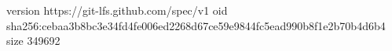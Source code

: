 version https://git-lfs.github.com/spec/v1
oid sha256:cebaa3b8bc3e34fd4fe006ed2268d67ce59e9844fc5ead990b8f1e2b70b4d6b4
size 349692
